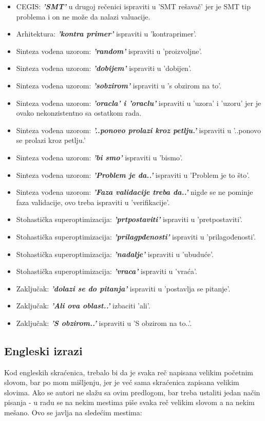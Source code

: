 \documentclass[a4paper]{report}
\begin{document}
\begin{itemize}
    \item CEGIS: \textbf{\textit{'SMT'}} u drugoj rečenici ispraviti u 'SMT rešavač' jer je SMT tip problema i on ne može da nalazi valuacije.
    \item Arhitektura: \textbf{\textit{'kontra primer'}} ispraviti u 'kontraprimer'.
    \item Sinteza vođena uzorom: \textbf{\textit{'random'}} ispraviti u 'proizvoljne'.
    \item Sinteza vođena uzorom: \textbf{\textit{'dobijem'}} ispraviti u 'dobijen'.
    \item Sinteza vođena uzorom: \textbf{\textit{'sobzirom'}} ispraviti u 's obzirom na to'.
    \item Sinteza vođena uzorom: \textbf{\textit{'oracla' i 'oraclu'}} ispraviti u 'uzora' i 'uzoru' jer je ovako nekonzistentno sa ostatkom rada.
    \item Sinteza vođena uzorom: \textbf{\textit{'..ponovo prolazi kroz petlju.'}} ispraviti u '..ponovo se prolazi kroz petlju.'
    \item Sinteza vođena uzorom: \textbf{\textit{'bi smo'}} ispraviti u 'bismo'.
    \item Sinteza vođena uzorom: \textbf{\textit{'Problem je da..'}} ispraviti u 'Problem je to što'.
    \item Sinteza vođena uzorom: \textbf{\textit{'Faza validacije treba da..'}} nigde se ne pominje faza validacije, ovo treba ispraviti u 'verifikacije'.
    \item Stohastička superoptimizacija: \textbf{\textit{'prtpostaviti'}} ispraviti u 'pretpostaviti'.
    \item Stohastička superoptimizacija: \textbf{\textit{'prilagpđenosti'}} ispraviti u 'prilagođenosti'.
    \item Stohastička superoptimizacija: \textbf{\textit{'nadalje'}} ispraviti u 'ubuduće'.
    \item Stohastička superoptimizacija: \textbf{\textit{'vraca'}} ispraviti u 'vraća'.
    \item Zaključak: \textbf{\textit{'dolazi se do pitanja'}} ispraviti u 'postavlja se pitanje'.
    \item Zaključak: \textbf{\textit{'Ali ova oblast..'}} izbaciti 'ali'.
    \item Zaključak: \textbf{\textit{'S obzirom..'}} ispraviti u 'S obzirom na to..'.
\end{itemize}

\subsection{Engleski izrazi}
Kod engleskih skraćenica, trebalo bi da je svaka reč napisana velikim početnim slovom, bar po mom mišljenju, jer je već sama skraćenica zapisana velikim slovima. Ako se autori ne slažu sa ovim predlogom, bar treba ustaliti jedan način pisanja - u radu se na nekim mestima piše svaka reč velikim slovom a na nekim mešano. Ovo se javlja na sledećim mestima:
\end{document}
